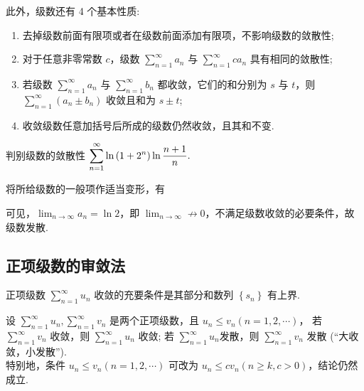 此外，级数还有 4 个基本性质:
\begin{enumerate}[label=(\arabic{*})]
    \item 去掉级数前面有限项或者在级数前面添加有限项，不影响级数的敛散性;
    \item 对于任意非零常数 $c$，级数 $\displaystyle\sum_{n=1}^{\infty}a_n\text{ 与 }\sum_{n=1}^{\infty}ca_n$ 具有相同的敛散性;
    \item 若级数 $\displaystyle\sum_{n=1}^{\infty}a_n\text{ 与 }\sum_{n=1}^{\infty}b_n$ 都收敛，它们的和分别为 $s\text{ 与 }t$，则 $\displaystyle\sum_{n=1}^{\infty}(a_n\pm b_n)$ 收敛且和为 $s\pm t$;
    \item 收敛级数任意加括号后所成的级数仍然收敛，且其和不变.
\end{enumerate}

\begin{example}
    判别级数的敛散性 $\displaystyle\sum_{n=1}^{\infty}\ln\qty(1+2^n)\ln\dfrac{n+1}{n}.$
\end{example}
\begin{solution}
    将所给级数的一般项作适当变形，有
    可见，$\displaystyle\lim_{n\to\infty}a_n=\ln 2$，即 $\displaystyle\lim_{n\to\infty}\not\to0$，不满足级数收敛的必要条件，故级数发散.
\end{solution}

\subsection{正项级数的审敛法}

\begin{theorem}[正项级数收敛的充要条件]
    正项级数 $\displaystyle  \sum_{n=1}^{\infty} u_{n} $ 收敛的充要条件是其部分和数列 $ \left\{s_{n}\right\} $ 有上界.
\end{theorem}

\begin{theorem}[比较审敛法]
    设 $\displaystyle  \sum_{n=1}^{\infty} u_{n}, \sum_{n=1}^{\infty} v_{n} $ 是两个正项级数，且 $ u_{n} \leqslant v_{n}(n=1,2, \cdots) $，
    若 $\displaystyle  \sum_{n=1}^{\infty} v_{n} $ 收敛，则 $\displaystyle  \sum_{n=1}^{\infty} u_{n} $ 收敛; 若 $\displaystyle  \sum_{n=1}^{\infty} u_{n}  $发散，则 $\displaystyle \sum_{n=1}^{\infty} v_{n} $ 发散 (“大收敛，小发散”).\\
    特别地，条件 $ u_{n} \leqslant v_{n}(n=1,2, \cdots) $ 可改为 $ u_{n} \leqslant c v_{n}(n \geqslant k, c>0)$，结论仍然成立.
\end{theorem}

